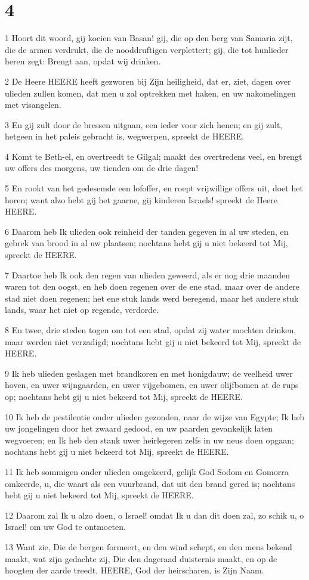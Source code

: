 \chapter{4}

\par 1 Hoort dit woord, gij koeien van Basan! gij, die op den berg van Samaria zijt, die de armen verdrukt, die de nooddruftigen verplettert; gij, die tot hunlieder heren zegt: Brengt aan, opdat wij drinken.
\par 2 De Heere HEERE heeft gezworen bij Zijn heiligheid, dat er, ziet, dagen over ulieden zullen komen, dat men u zal optrekken met haken, en uw nakomelingen met visangelen.
\par 3 En gij zult door de bressen uitgaan, een ieder voor zich henen; en gij zult, hetgeen in het paleis gebracht is, wegwerpen, spreekt de HEERE.
\par 4 Komt te Beth-el, en overtreedt te Gilgal; maakt des overtredens veel, en brengt uw offers des morgens, uw tienden om de drie dagen!
\par 5 En rookt van het gedesemde een lofoffer, en roept vrijwillige offers uit, doet het horen; want alzo hebt gij het gaarne, gij kinderen Israels! spreekt de Heere HEERE.
\par 6 Daarom heb Ik ulieden ook reinheid der tanden gegeven in al uw steden, en gebrek van brood in al uw plaatsen; nochtans hebt gij u niet bekeerd tot Mij, spreekt de HEERE.
\par 7 Daartoe heb Ik ook den regen van ulieden geweerd, als er nog drie maanden waren tot den oogst, en heb doen regenen over de ene stad, maar over de andere stad niet doen regenen; het ene stuk lands werd beregend, maar het andere stuk lands, waar het niet op regende, verdorde.
\par 8 En twee, drie steden togen om tot een stad, opdat zij water mochten drinken, maar werden niet verzadigd; nochtans hebt gij u niet bekeerd tot Mij, spreekt de HEERE.
\par 9 Ik heb ulieden geslagen met brandkoren en met honigdauw; de veelheid uwer hoven, en uwer wijngaarden, en uwer vijgebomen, en uwer olijfbomen at de rups op; nochtans hebt gij u niet bekeerd tot Mij, spreekt de HEERE.
\par 10 Ik heb de pestilentie onder ulieden gezonden, naar de wijze van Egypte; Ik heb uw jongelingen door het zwaard gedood, en uw paarden gevankelijk laten wegvoeren; en Ik heb den stank uwer heirlegeren zelfs in uw neus doen opgaan; nochtans hebt gij u niet bekeerd tot Mij, spreekt de HEERE.
\par 11 Ik heb sommigen onder ulieden omgekeerd, gelijk God Sodom en Gomorra omkeerde, u, die waart als een vuurbrand, dat uit den brand gered is; nochtans hebt gij u niet bekeerd tot Mij, spreekt de HEERE.
\par 12 Daarom zal Ik u alzo doen, o Israel! omdat Ik u dan dit doen zal, zo schik u, o Israel! om uw God te ontmoeten.
\par 13 Want zie, Die de bergen formeert, en den wind schept, en den mens bekend maakt, wat zijn gedachte zij, Die den dageraad duisternis maakt, en op de hoogten der aarde treedt, HEERE, God der heirscharen, is Zijn Naam.

